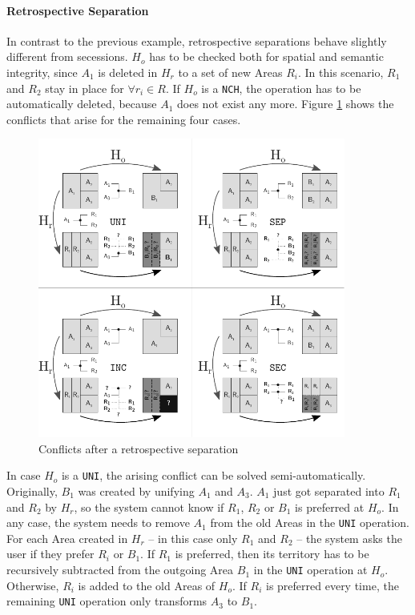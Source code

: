 
\paragraph{Retrospective Separation} %
\label{par:retrospective_separation}

In contrast to the previous example, retrospective separations behave slightly different from secessions. $H_o$ has to be checked both for spatial and semantic integrity, since $A_1$ is deleted in $H_r$ to a set of new Areas $R_i$. In this scenario, $R_1$ and $R_2$ stay in place for $\forall r_i \in R$. If $H_o$ is a \texttt{NCH}, the operation has to be automatically deleted, because $A_1$ does not exist any more. Figure \ref{fig:update_conflict_SEP} shows the conflicts that arise for the remaining four cases.

\begin{figure}[ht]
\vspace{1em}
  \centering
  \includegraphics[width=0.9\textwidth]{graphics/development/editing_hivent_data/retrospective_updates/SEP}
  \caption{Conflicts after a retrospective separation}
  \label{fig:update_conflict_SEP}
\end{figure}

In case $H_o$ is a \texttt{UNI}, the arising conflict can be solved semi-automatically. Originally, $B_1$ was created by unifying $A_1$ and $A_3$. $A_1$ just got separated into $R_1$ and $R_2$ by $H_r$, so the system cannot know if $R_1$, $R_2$ or $B_1$ is preferred at $H_o$. In any case, the system needs to remove $A_1$ from the old Areas in the \texttt{UNI} operation. For each Area created in $H_r$ -- in this case only $R_1$ and $R_2$ -- the system asks the user if they prefer $R_i$ or $B_1$. If $R_1$ is preferred, then its territory has to be recursively subtracted from the outgoing Area $B_1$ in the \texttt{UNI} operation at $H_o$. Otherwise, $R_i$ is added to the old Areas of $H_o$. If $R_i$ is preferred every time, the remaining \texttt{UNI} operation only transforms $A_3$ to $B_1$.

